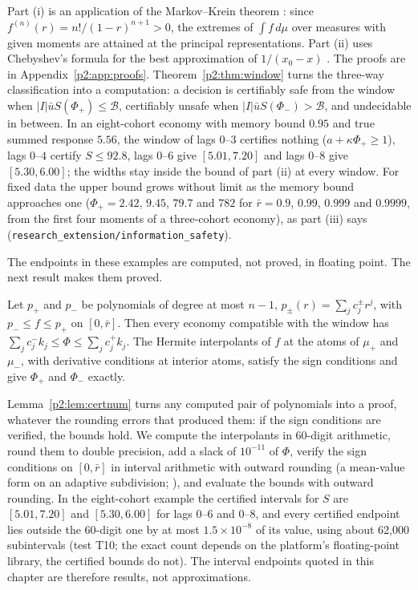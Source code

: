 Part (i) is an application of the Markov--Krein theorem \citep{p2:krein1977,p2:karlin1966}: since $f^{(n)}(r)=n!/(1-r)^{n+1}>0$, the extremes of $\int f\,d\mu$ over measures with given moments are attained at the principal representations. Part (ii) uses Chebyshev's formula for the best approximation of $1/(x_0-x)$ \citep{p2:achieser1956}. The proofs are in Appendix~\ref{p2:app:proofs}. Theorem~\ref{p2:thm:window} turns the three-way classification into a computation: a decision is certifiably safe from the window when $|I|\bar uS(\Phi_+)\le\mathcal B$, certifiably unsafe when $|I|\bar uS(\Phi_-)>\mathcal B$, and undecidable in between. In an eight-cohort economy with memory bound $0.95$ and true summed response $5.56$, the window of lags $0$--$3$ certifies nothing ($a+\kappa\Phi_+\ge1$), lags $0$--$4$ certify $S\le92.8$, lags $0$--$6$ give $[5.01,7.20]$ and lags $0$--$8$ give $[5.30,6.00]$; the widths stay inside the bound of part (ii) at every window. For fixed data the upper bound grows without limit as the memory bound approaches one ($\Phi_+=2.42$, $9.45$, $79.7$ and $782$ for $\bar r=0.9$, $0.99$, $0.999$ and $0.9999$, from the first four moments of a three-cohort economy), as part (iii) says (\texttt{research\_extension/information\_safety}).

The endpoints in these examples are computed, not proved, in floating point. The next result makes them proved.

\begin{lemma}\label{p2:lem:certnum}
Let $p_+$ and $p_-$ be polynomials of degree at most $n-1$, $p_\pm(r)=\sum_jc^\pm_jr^j$, with $p_-\le f\le p_+$ on $[0,\bar r]$. Then every economy compatible with the window has $\sum_jc^-_jk_j\le\Phi\le\sum_jc^+_jk_j$. The Hermite interpolants of $f$ at the atoms of $\mu_+$ and $\mu_-$, with derivative conditions at interior atoms, satisfy the sign conditions and give $\Phi_+$ and $\Phi_-$ exactly.
\end{lemma}

Lemma~\ref{p2:lem:certnum} turns any computed pair of polynomials into a proof, whatever the rounding errors that produced them: if the sign conditions are verified, the bounds hold. We compute the interpolants in 60-digit arithmetic, round them to double precision, add a slack of $10^{-11}$ of $\Phi$, verify the sign conditions on $[0,\bar r]$ in interval arithmetic with outward rounding (a mean-value form on an adaptive subdivision; \citealp{p2:rump2010}), and evaluate the bounds with outward rounding. In the eight-cohort example the certified intervals for $S$ are $[5.01,7.20]$ and $[5.30,6.00]$ for lags $0$--$6$ and $0$--$8$, and every certified endpoint lies outside the 60-digit one by at most $1.5\times10^{-8}$ of its value, using about 62{,}000 subintervals (test T10; the exact count depends on the platform's floating-point library, the certified bounds do not). The interval endpoints quoted in this chapter are therefore results, not approximations.

